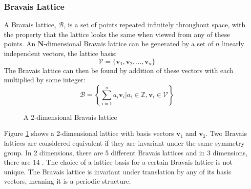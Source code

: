 \documentclass[12pt]{article}
\begin{document}
\subsubsection{Bravais Lattice}
A Bravais lattice, $\mathcal{B}$, is a set of points repeated infinitely throughout space, with the property that the lattice looks the same when viewed from any of these points. 
An $\mathbf{N}$-$\mathrm{dimensional}$ Bravais lattice can be generated by a set of $n$ linearly independent vectors, the lattice basis:
\begin{equation}\label{eq:lattice_basis}
	\mathcal{V} = \{\mathbf{v}_1, \mathbf{v}_2, ..., \mathbf{v}_n\}
\end{equation}
The Bravais lattice can then be found by addition of these vectors with each multiplied by some integer:
\begin{equation}\label{eq:bravais_lattice}
	\mathcal{B} = \left \{\sum_{i=1}^n a_i\mathbf{v}_i \Big | a_i \in \mathbb{Z}, \mathbf{v}_i \in \mathcal{V}  \right \}
\end{equation}

\begin{figure}
\centering
{}%
\caption{A 2-dimensional Bravais lattice}
\label{fig:lattice_basis}
\end{figure}

Figure \ref{fig:lattice_basis} shows a 2-dimensional lattice with basis vectors $\mathbf{v}_1$ and $\mathbf{v}_2$. Two Bravais lattices are considered equivalent if they are invariant under the same symmetry group. In 2 dimensions, there are 5 different Bravais lattices and in 3 dimensions, there are 14 \cite{kittel2005introduction}. The choice of a lattice basis for a certain Bravais lattice is not unique.
The Bravais lattice is invariant under translation by any of its basis vectors, meaning it is a periodic structure. 
\end{document}

